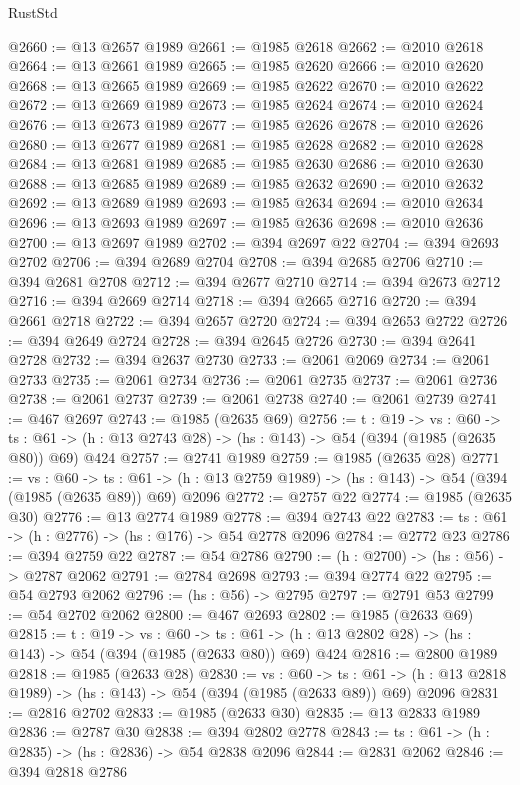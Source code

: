 \begin{lexlean}{RustStd}
\begin{coremodule}
{\begin{coremodule}
{{{{{{{{{{@2660 := @13 @2657 @1989
@2661 := @1985 @2618
@2662 := @2010 @2618
@2664 := @13 @2661 @1989
@2665 := @1985 @2620
@2666 := @2010 @2620
@2668 := @13 @2665 @1989
@2669 := @1985 @2622
@2670 := @2010 @2622
@2672 := @13 @2669 @1989
@2673 := @1985 @2624
@2674 := @2010 @2624
@2676 := @13 @2673 @1989
@2677 := @1985 @2626
@2678 := @2010 @2626
@2680 := @13 @2677 @1989
@2681 := @1985 @2628
@2682 := @2010 @2628
@2684 := @13 @2681 @1989
@2685 := @1985 @2630
@2686 := @2010 @2630
@2688 := @13 @2685 @1989
@2689 := @1985 @2632
@2690 := @2010 @2632
@2692 := @13 @2689 @1989
@2693 := @1985 @2634
@2694 := @2010 @2634
@2696 := @13 @2693 @1989
@2697 := @1985 @2636
@2698 := @2010 @2636
@2700 := @13 @2697 @1989
@2702 := @394 @2697 @22
@2704 := @394 @2693 @2702
@2706 := @394 @2689 @2704
@2708 := @394 @2685 @2706
@2710 := @394 @2681 @2708
@2712 := @394 @2677 @2710
@2714 := @394 @2673 @2712
@2716 := @394 @2669 @2714
@2718 := @394 @2665 @2716
@2720 := @394 @2661 @2718
@2722 := @394 @2657 @2720
@2724 := @394 @2653 @2722
@2726 := @394 @2649 @2724
@2728 := @394 @2645 @2726
@2730 := @394 @2641 @2728
@2732 := @394 @2637 @2730
@2733 := @2061 @2069
@2734 := @2061 @2733
@2735 := @2061 @2734
@2736 := @2061 @2735
@2737 := @2061 @2736
@2738 := @2061 @2737
@2739 := @2061 @2738
@2740 := @2061 @2739
@2741 := @467 @2697
@2743 := @1985 (@2635 @69)
@2756 := {t : @19} ->
  {vs : @60} ->
  {ts : @61} -> (h : @13 @2743 @28) -> (hs : @143) -> @54 (@394 (@1985 (@2635 @80)) @69) @424
@2757 := @2741 @1989
@2759 := @1985 (@2635 @28)
@2771 := {vs : @60} ->
  {ts : @61} -> (h : @13 @2759 @1989) -> (hs : @143) -> @54 (@394 (@1985 (@2635 @89)) @69) @2096
@2772 := @2757 @22
@2774 := @1985 (@2635 @30)
@2776 := @13 @2774 @1989
@2778 := @394 @2743 @22
@2783 := {ts : @61} -> (h : @2776) -> (hs : @176) -> @54 @2778 @2096
@2784 := @2772 @23
@2786 := @394 @2759 @22
@2787 := @54 @2786
@2790 := (h : @2700) -> (hs : @56) -> @2787 @2062
@2791 := @2784 @2698
@2793 := @394 @2774 @22
@2795 := @54 @2793 @2062
@2796 := (hs : @56) -> @2795
@2797 := @2791 @53
@2799 := @54 @2702 @2062
@2800 := @467 @2693
@2802 := @1985 (@2633 @69)
@2815 := {t : @19} ->
  {vs : @60} ->
  {ts : @61} -> (h : @13 @2802 @28) -> (hs : @143) -> @54 (@394 (@1985 (@2633 @80)) @69) @424
@2816 := @2800 @1989
@2818 := @1985 (@2633 @28)
@2830 := {vs : @60} ->
  {ts : @61} -> (h : @13 @2818 @1989) -> (hs : @143) -> @54 (@394 (@1985 (@2633 @89)) @69) @2096
@2831 := @2816 @2702
@2833 := @1985 (@2633 @30)
@2835 := @13 @2833 @1989
@2836 := @2787 @30
@2838 := @394 @2802 @2778
@2843 := {ts : @61} -> (h : @2835) -> (hs : @2836) -> @54 @2838 @2096
@2844 := @2831 @2062
@2846 := @394 @2818 @2786
}}}}}}}}}}
\end{coremodule}}
\end{coremodule}
\end{lexlean}
